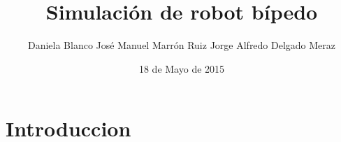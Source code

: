 \documentclass[10pt]{article}
\title{Simulación de robot bípedo}
\date{18 de Mayo de 2015}
\author{
	Daniela Blanco
	José Manuel Marrón Ruiz
	Jorge Alfredo Delgado Meraz
}
\begin{document}
\maketitle
\section{Introduccion}
\end{document}
